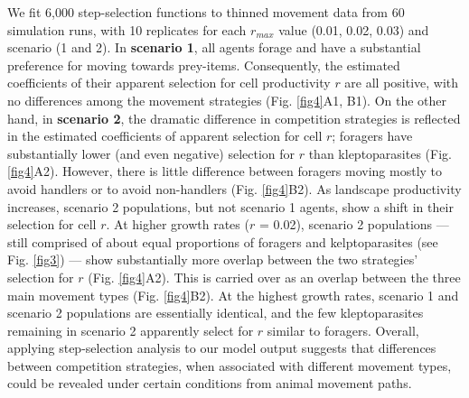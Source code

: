     We fit 6,000 step-selection functions to thinned movement data from 60 simulation runs, with 10 replicates for each $r_{max}$ value (0.01, 0.02, 0.03) and scenario (1 and 2).
    In \textbf{scenario 1}, all agents forage and have a substantial preference for moving towards prey-items.
    Consequently, the estimated coefficients of their apparent selection for cell productivity $r$ are all positive, with no differences among the movement strategies (Fig. \ref{fig4}A1, B1).
    On the other hand, in \textbf{scenario 2}, the dramatic difference in competition strategies is reflected in the estimated coefficients of apparent selection for cell $r$; foragers have substantially lower (and even negative) selection for $r$ than kleptoparasites (Fig. \ref{fig4}A2).
    However, there is little difference between foragers moving mostly to avoid handlers or to avoid non-handlers (Fig. \ref{fig4}B2).
    As landscape productivity increases, scenario 2 populations, but not scenario 1 agents, show a shift in their selection for cell $r$.
    At higher growth rates ($r$ = 0.02), scenario 2 populations --- still comprised of about equal proportions of foragers and kelptoparasites (see Fig. \ref{fig3}) --- show substantially more overlap between the two strategies' selection for $r$ (Fig. \ref{fig4}A2).
    This is carried over as an overlap between the three main movement types (Fig. \ref{fig4}B2).
    At the highest growth rates, scenario 1 and scenario 2 populations are essentially identical, and the few kleptoparasites remaining in scenario 2 apparently select for $r$ similar to foragers.
    Overall, applying step-selection analysis to our model output suggests that differences between competition strategies, when associated with different movement types, could be revealed under certain conditions from animal movement paths.
    
